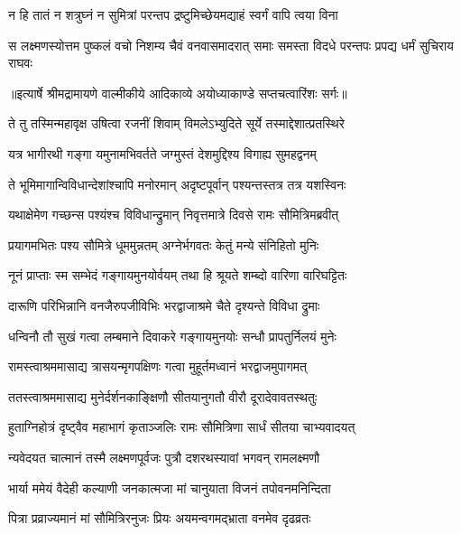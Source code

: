 \twolineshloka
{न हि तातं न शत्रुघ्नं न सुमित्रां परन्तप}
{द्रष्टुमिच्छेयमद्याहं स्वर्गं वापि त्वया विना} %

\fourlineindentedshloka
{स लक्ष्मणस्योत्तम पुष्कलं वचो}
{निशम्य चैवं वनवासमादरात्}
{समाः समस्ता विदधे परन्तपः}
{प्रपद्य धर्मं सुचिराय राघवः} %


{॥इत्यार्षे श्रीमद्रामायणे वाल्मीकीये आदिकाव्ये अयोध्याकाण्डे सप्तचत्वारिंशः सर्गः॥}


\twolineshloka
{ते तु तस्मिन्महावृक्ष उषित्वा रजनीं शिवाम्}
{विमलेऽभ्युदिते सूर्ये तस्माद्देशात्प्रतस्थिरे} %

\twolineshloka
{यत्र भागीरथी गङ्गा यमुनामभिवर्तते}
{जग्मुस्तं देशमुद्दिश्य विगाह्य सुमहद्वनम्} %

\twolineshloka
{ते भूमिमागान्विविधान्देशांश्चापि मनोरमान्}
{अदृष्टपूर्वान् पश्यन्तस्तत्र तत्र यशस्विनः} %

\twolineshloka
{यथाक्षेमेण गच्छन्स पश्यंश्च विविधान्द्रुमान्}
{निवृत्तमात्रे दिवसे रामः सौमित्रिमब्रवीत्} %

\twolineshloka
{प्रयागमभितः पश्य सौमित्रे धूममुन्नतम्}
{अग्नेर्भगवतः केतुं मन्ये संनिहितो मुनिः} %

\twolineshloka
{नूनं प्राप्ताः स्म सम्भेदं गङ्गायमुनयोर्वयम्}
{तथा हि श्रूयते शम्ब्दो वारिणा वारिघट्टितः} %

\twolineshloka
{दारूणि परिभिन्नानि वनजैरुपजीविभिः}
{भरद्वाजाश्रमे चैते दृश्यन्ते विविधा द्रुमाः} %

\twolineshloka
{धन्विनौ तौ सुखं गत्वा लम्बमाने दिवाकरे}
{गङ्गायमुनयोः सन्धौ प्रापतुर्निलयं मुनेः} %

\twolineshloka
{रामस्त्वाश्रममासाद्य त्रासयन्मृगपक्षिणः}
{गत्वा मुहूर्तमध्वानं भरद्वाजमुपागमत्} %

\twolineshloka
{ततस्त्वाश्रममासाद्य मुनेर्दर्शनकाङ्क्षिणौ}
{सीतयानुगतौ वीरौ दूरादेवावतस्थतुः} %

\twolineshloka
{हुताग्निहोत्रं दृष्ट्वैव महाभागं कृताञ्जलिः}
{रामः सौमित्रिणा सार्धं सीतया चाभ्यवादयत्} %

\twolineshloka
{न्यवेदयत चात्मानं तस्मै लक्ष्मणपूर्वजः}
{पुत्रौ दशरथस्यावां भगवन् रामलक्ष्मणौ} %

\twolineshloka
{भार्या ममेयं वैदेही कल्याणी जनकात्मजा}
{मां चानुयाता विजनं तपोवनमनिन्दिता} %

\twolineshloka
{पित्रा प्रव्राज्यमानं मां सौमित्रिरनुजः प्रियः}
{अयमन्वगमद्भ्राता वनमेव दृढव्रतः} %

